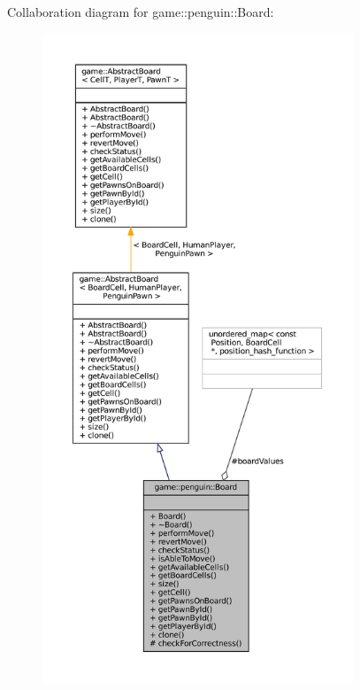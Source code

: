 Collaboration diagram for game\+:\+:penguin\+:\+:Board\+:
\nopagebreak
\begin{figure}[H]
\begin{center}
\leavevmode
\includegraphics[height=550pt]{classgame_1_1penguin_1_1_board__coll__graph}
\end{center}
\end{figure}
